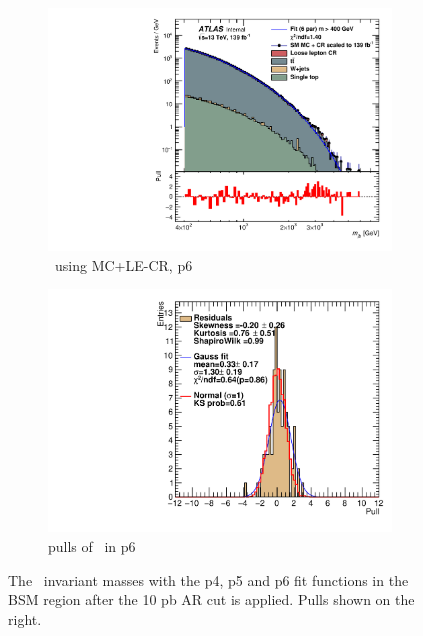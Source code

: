 \begin{figure}[H]
\begin{subfigure}[h]{0.38\linewidth}
    \includegraphics[scale=0.3]{figs/ch6/fit/variable_nosmooth/p6/10PB/output_SMMCplusCR_Mjb_p6.pdf}%
    \caption{\mjb \ using MC+LE-CR, p6}
    \end{subfigure}
    \hfill
    \begin{subfigure}[h]{0.4\linewidth}
    \includegraphics[scale=0.32]{figs/ch6/fit/variable_nosmooth/p6/10PB/pull_SMMCplusCR_Mjb_p6.pdf}%
    \caption{pulls of \mjb \ in p6}
    \end{subfigure}
    \hfill
    \caption{The \mjb \ invariant masses with the p4, p5 and p6 fit functions in the BSM region after the 10 pb AR cut is applied. Pulls shown on the right.}
\label{fig:mjb-fit-pulls}
\end{figure}

\newpage

